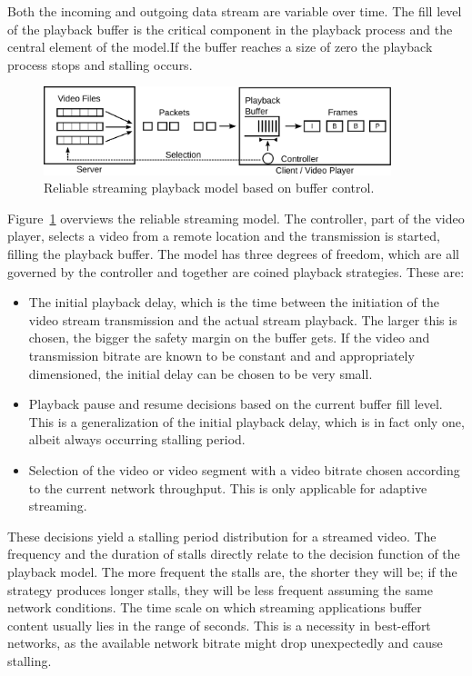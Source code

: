Both the incoming and outgoing data stream are variable over time. The fill level of the playback buffer is the critical component in the playback process and the central element of the model.If the buffer reaches a size of zero the playback process stops and stalling occurs.

\begin{figure}[htb]
    \centering
    \includegraphics[width=0.9\textwidth]{images/playback-model.pdf}
    \caption{Reliable streaming playback model based on buffer control.}
    \label{c3:fig:playback-model}
\end{figure}

Figure~\ref{c3:fig:playback-model} overviews the reliable streaming model. The controller, part of the video player, selects a video from a remote location and the transmission is started, filling the playback buffer. The model has three degrees of freedom, which are all governed by the controller and together are coined playback strategies. These are:

\begin{itemize}
    \item The initial playback delay, which is the time between the initiation of the video stream transmission and the actual stream playback. The larger this is chosen, the bigger the safety margin on the buffer gets. If the video and transmission bitrate are known to be constant and and appropriately dimensioned, the initial delay can be chosen to be very small.
    \item Playback pause and resume decisions based on the current buffer fill level. This is a generalization of the initial playback delay, which is in fact only one, albeit always occurring stalling period.
    \item Selection of the video or video segment with a video bitrate chosen according to the current network throughput. This is only applicable for adaptive streaming.
\end{itemize}


These decisions yield a stalling period distribution for a streamed video. The frequency and the duration of stalls directly relate to the decision function of the playback model. The more frequent the stalls are, the shorter they will be; if the strategy produces longer stalls, they will be less frequent assuming the same network conditions. The time scale on which streaming applications buffer content usually lies in the range of seconds. This is a necessity in best-effort networks, as the available network bitrate might drop unexpectedly and cause stalling.


